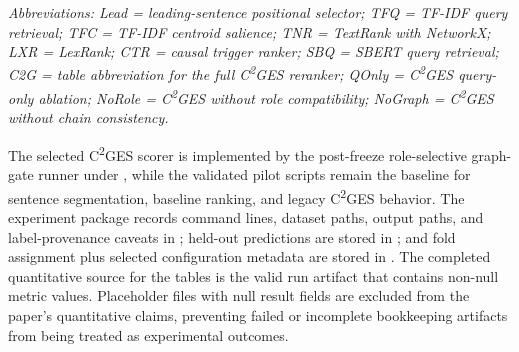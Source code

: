 \documentclass{ieeeaccess}
\begin{document}
\begin{table}[ht]
\centering
\caption{Hyperparameter settings}
\label{tab:2}
\end{table}

\textit{Abbreviations: Lead = leading-sentence positional selector; TFQ = TF-IDF query retrieval; TFC = TF-IDF centroid salience; TNR = TextRank with NetworkX; LXR = LexRank; CTR = causal trigger ranker; SBQ = SBERT query retrieval; C2G = table abbreviation for the full C\textsuperscript{2}GES reranker; QOnly = C\textsuperscript{2}GES query-only ablation; NoRole = C\textsuperscript{2}GES without role compatibility; NoGraph = C\textsuperscript{2}GES without chain consistency.}

The selected C\textsuperscript{2}GES scorer is implemented by the post-freeze role-selective graph-gate runner under , while the validated pilot scripts remain the baseline for sentence segmentation, baseline ranking, and legacy C\textsuperscript{2}GES behavior. The experiment package records command lines, dataset paths, output paths, and label-provenance caveats in ; held-out predictions are stored in ; and fold assignment plus selected configuration metadata are stored in . The completed quantitative source for the tables is the valid run artifact that contains non-null metric values. Placeholder files with null result fields are excluded from the paper's quantitative claims, preventing failed or incomplete bookkeeping artifacts from being treated as experimental outcomes.
\end{document}
